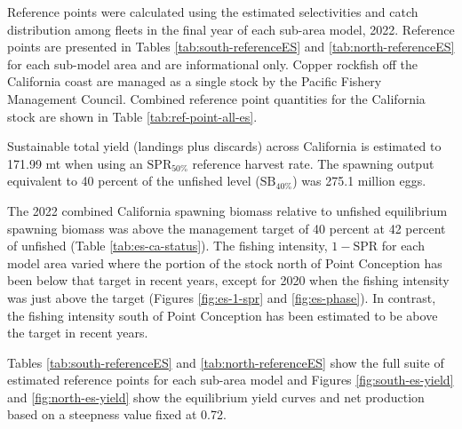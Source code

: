 \documentclass[11pt,
  english,
  letterpaper,
]{article}
\begin{document}
Reference points were calculated using the estimated selectivities and catch distribution among fleets in the final year of each sub-area model, 2022. Reference points are presented in Tables \ref{tab:south-referenceES} and \ref{tab:north-referenceES} for each sub-model area and are informational only. Copper rockfish off the California coast are managed as a single stock by the Pacific Fishery Management Council. Combined reference point quantities for the California stock are shown in Table \ref{tab:ref-point-all-es}.

Sustainable total yield (landings plus discards) across California is estimated to 171.99 mt when using an \(\text{SPR}_{50\%}\) reference harvest rate. The spawning output equivalent to 40 percent of the unfished level (\(\text{SB}_{40\%}\)) was 275.1 million eggs.

The 2022 combined California spawning biomass relative to unfished equilibrium spawning biomass was above the management target of 40 percent at 42 percent of unfished (Table \ref{tab:es-ca-status}). The fishing intensity, \(1-\text{SPR}\) for each model area varied where the portion of the stock north of Point Conception has been below that target in recent years, except for 2020 when the fishing intensity was just above the target (Figures \ref{fig:es-1-spr} and \ref{fig:es-phase}). In contrast, the fishing intensity south of Point Conception has been estimated to be above the target in recent years.

Tables \ref{tab:south-referenceES} and \ref{tab:north-referenceES} show the full suite of estimated reference points for each sub-area model and Figures \ref{fig:south-es-yield} and \ref{fig:north-es-yield} show the equilibrium yield curves and net production based on a steepness value fixed at 0.72.

\newpage



\newpage



\begingroup\fontsize{10}{12}\selectfont
\begingroup\fontsize{10}{12}\selectfont
\end{document}
